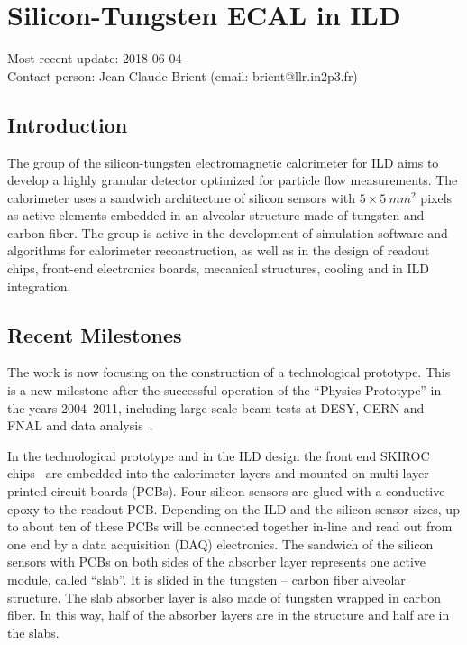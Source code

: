 \section{Silicon-Tungsten ECAL in ILD}
Most recent update: 2018-06-04\\
Contact person: Jean-Claude Brient (email: brient@llr.in2p3.fr)
\subsection{Introduction}
The group of the silicon-tungsten electromagnetic calorimeter for ILD aims to develop a highly
granular detector optimized for particle flow measurements. The calorimeter uses a
sandwich architecture of silicon sensors with $5\times \SI{5}{mm^2}$ pixels as active elements embedded in an
alveolar structure made of tungsten and carbon fiber. The group is active in the development of
simulation software and algorithms for calorimeter reconstruction, as well as in the design of readout
chips, front-end electronics boards, mecanical structures, cooling and in ILD
integration.

\subsection{Recent Milestones}
The work is now focusing on the construction of a technological prototype. This
is a new milestone after the successful operation of the ``Physics Prototype'' in the
years 2004--2011, including large scale beam tests at DESY, CERN and FNAL and data
analysis~\cite{1748-0221-3-08-P08001,2009JPhCS.160a2065B,2010JInst...5T5007A,Adloff201197,1748-0221-6-07-P07005}.

In the technological prototype and in the ILD design the front end SKIROC
chips~\cite{1748-0221-6-12-C12040,Amjad201578} are embedded into the calorimeter layers and mounted on
multi-layer printed circuit boards (PCBs). Four silicon sensors are glued with
a conductive epoxy to the readout PCB. Depending on the ILD and the silicon
sensor sizes, up to about ten of these PCBs will be connected together in-line
and read out from one end by a data acquisition (DAQ) electronics. The sandwich
of the silicon sensors with PCBs on both sides of the absorber layer
represents one active module, called ``slab''. It is slided in the tungsten --
carbon fiber alveolar structure. The slab absorber layer is also made of
tungsten wrapped in carbon fiber. In this way, half of the absorber layers are
in the structure and half are in the slabs.

